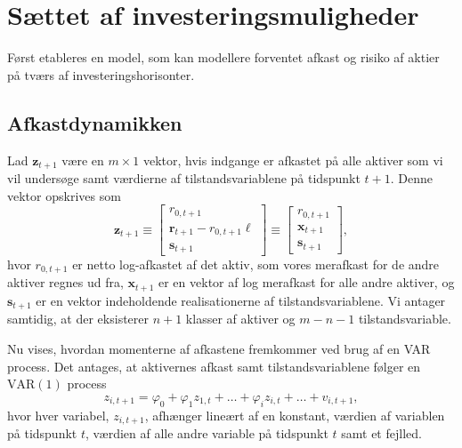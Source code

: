 \documentclass[
  a4paper,
  oneside]{memoir}
\begin{document}
\hypertarget{setafinv}{%
\section{Sættet af investeringsmuligheder}\label{setafinv}}

Først etableres en model, som kan modellere forventet afkast og risiko af aktier på tværs af investeringshorisonter.

\subsection{Afkastdynamikken}

Lad \(\bm{z}_{t+1}\) være en \(m\times 1\) vektor, hvis indgange er afkastet på alle aktiver som vi vil undersøge samt værdierne af tilstandsvariablene på tidspunkt \(t+1\). Denne vektor opskrives som
\begin{equation}
        \bm{z}_{t+1}\equiv
        \begin{bmatrix}
        r_{0,t+1}\\
        \bm{r}_{t+1}-r_{0,t+1}\bm{\ell}\\
        \bm{s}_{t+1}
        \end{bmatrix}\equiv
        \begin{bmatrix}
        r_{0,t+1}\\
        \bm{x}_{t+1}\\
        \bm{s}_{t+1}
        \end{bmatrix},
    \end{equation}
hvor \(r_{0,t+1}\) er netto log-afkastet af det aktiv, som vores merafkast for de andre aktiver regnes ud fra, \(\bm{x}_{t+1}\) er en vektor af log merafkast for alle andre aktiver, og \(\bm{s}_{t+1}\) er en vektor indeholdende realisationerne af tilstandsvariablene. Vi antager samtidig, at der eksisterer \(n+1\) klasser af aktiver og \(m-n-1\) tilstandsvariable.

\vspace{5mm}

Nu vises, hvordan momenterne af afkastene fremkommer ved brug af en VAR process. Det antages, at aktivernes afkast samt tilstandsvariablene følger en \(\text{VAR}(1)\) process
\begin{equation}
        z_{i,t+1}=\varphi_0+\varphi_1 z_{1,t}+\dots+\varphi_i z_{i,t}+\dots+v_{i,t+1},
    \end{equation}
hvor hver variabel, \(z_{i,t+1}\), afhænger lineært af en konstant, værdien af variablen på tidspunkt \(t\), værdien af alle andre variable på tidspunkt \(t\) samt et fejlled.
\end{document}
